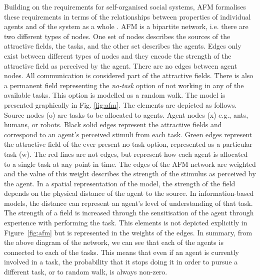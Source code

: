 \documentclass{intech}
\begin{document}
Building on the requirements for self-organised social systems, AFM formalises these requirements in terms of the relationships between properties of individual agents and of the system as a whole \citet{Arcaute+2008}.  AFM is a bipartite network, i.e. there are two different types of nodes.  One set of nodes describes the sources of the attractive fields, the tasks, and the other set describes the agents.  Edges only exist between different types of nodes and they encode the strength of the attractive field as perceived by the agent.  There are no edges between agent nodes.  All communication is considered part of the attractive fields.  There is also a permanent field representing the {\em no-task} option of not working in any of the available tasks.  This option is modelled as a random walk.  The model is presented graphically in Fig. \ref{fig:afm}.  The elements are depicted as follows.
Source nodes (o) are tasks to be allocated to agents.
Agent nodes (x) e.g., ants, humans, or robots.
Black solid edges represent the attractive fields and correspond to an agent's perceived stimuli from each task.
Green edges represent the attractive field of the ever present no-task option, represented as a particular task (w).
The red lines are not edges, but represent how each agent is allocated to a single task at any point in time.
The edges of the AFM network are weighted and the value of this weight describes the strength of the stimulus as perceived by the agent.  In a spatial representation of the model, the strength of the field depends on the physical distance of the agent to the source.  In information-based models, the distance can represent an agent's level of understanding of that task.  The strength of a field is increased through the sensitisation of the agent through experience with performing the task.  This elements is not depicted explicitly in Figure~\ref{fig:afm} but is represented in the weights of the edges.  
In summary, from the above diagram of the network, we can see that each of the agents is connected to each of the tasks. This means that even if an agent is currently involved in a task, the probability that it stops doing it in order to pursue a different task, or to random walk, is always non-zero.
\end{document}
